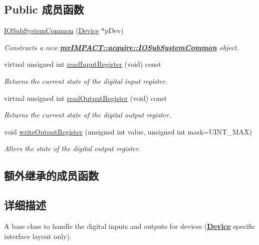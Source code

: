 \subsection*{Public 成员函数}
\begin{DoxyCompactItemize}
\item 
\hyperlink{classmv_i_m_p_a_c_t_1_1acquire_1_1_i_o_sub_system_common_a0c3d31940f4d07a231a2b08e749d1ef1}{I\+O\+Sub\+System\+Common} (\hyperlink{classmv_i_m_p_a_c_t_1_1acquire_1_1_device}{Device} $\ast$p\+Dev)
\begin{DoxyCompactList}\small\item\em Constructs a new {\bfseries \hyperlink{classmv_i_m_p_a_c_t_1_1acquire_1_1_i_o_sub_system_common}{mv\+I\+M\+P\+A\+C\+T\+::acquire\+::\+I\+O\+Sub\+System\+Common}} object. \end{DoxyCompactList}\item 
virtual unsigned int \hyperlink{classmv_i_m_p_a_c_t_1_1acquire_1_1_i_o_sub_system_common_a52b6ff935e658f10740affb6f02ca688}{read\+Input\+Register} (void) const 
\begin{DoxyCompactList}\small\item\em Returns the current state of the digital input register. \end{DoxyCompactList}\item 
virtual unsigned int \hyperlink{classmv_i_m_p_a_c_t_1_1acquire_1_1_i_o_sub_system_common_ad8fa21aced46ef81615db07bd6421645}{read\+Output\+Register} (void) const 
\begin{DoxyCompactList}\small\item\em Returns the current state of the digital output register. \end{DoxyCompactList}\item 
void \hyperlink{classmv_i_m_p_a_c_t_1_1acquire_1_1_i_o_sub_system_common_a6021cce5baf25b4cd055b009a58d0c00}{write\+Output\+Register} (unsigned int value, unsigned int mask=U\+I\+N\+T\+\_\+\+M\+A\+X)
\begin{DoxyCompactList}\small\item\em Alters the state of the digital output register. \end{DoxyCompactList}\end{DoxyCompactItemize}
\subsection*{额外继承的成员函数}


\subsection{详细描述}
A base class to handle the digital inputs and outputs for devices ({\bfseries \hyperlink{classmv_i_m_p_a_c_t_1_1acquire_1_1_device}{Device}} specific interface layout only). 

